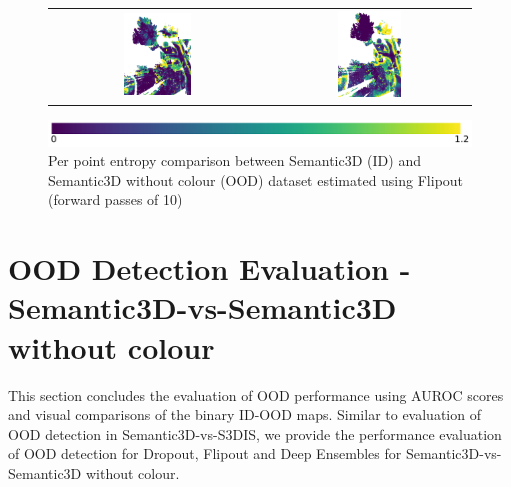 \begin{figure}[h!]
\begin{tabular}{cc}
            \includegraphics[width=0.33\textwidth, height=0.22\textheight]{images/ood_imgs/fout_sem3d/fout_ent_3.pdf}&
            \includegraphics[width=0.33\textwidth, height=0.22\textheight]{images/sem3d_of/fout_ent_sem3d_of_3.pdf}\\
        \end{tabular}
        \includegraphics[scale=0.45]{images/ent_legend.pdf}
        \caption{Per point entropy comparison between Semantic3D (ID) and Semantic3D without colour (OOD) dataset estimated using Flipout (forward passes of 10)}
        \label{fig:fout_entmap_vis_sem3d_OF}
    \end{figure} 
    \FloatBarrier


    \section{OOD Detection Evaluation -  Semantic3D-vs-Semantic3D without colour}
    This section concludes the evaluation of OOD performance using AUROC scores and visual comparisons of the binary ID-OOD maps.
    Similar to evaluation of OOD detection in Semantic3D-vs-S3DIS, we provide the performance evaluation of OOD detection for Dropout, Flipout and Deep Ensembles for Semantic3D-vs-Semantic3D without colour.
    
